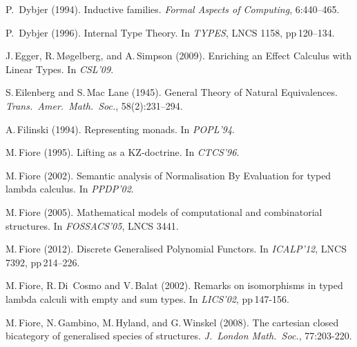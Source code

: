 \documentclass[11pt,twocolumn]{article}
\begin{document}
{\begin{thebibliography}{000}
P.~Dybjer (1994).
\newblock Inductive families.
\newblock \emph{Formal Aspects of Computing}, 6:440--465.

P.~Dybjer (1996).
\newblock Internal Type Theory.
\newblock In \emph{TYPES}, LNCS 1158, pp\,120--134.


J.\,Egger, R.\,M{\o}gelberg, and A.\,Simpson (2009). 
\newblock Enriching an Effect Calculus with Linear Types. 
\newblock In \emph{CSL'09}.

S.\,Eilenberg and S.\,Mac Lane (1945).
\newblock General Theory of Natural Equivalences.
\newblock \emph{Trans.\ Amer.\ Math.\ Soc.},
  58(2):231--294. 

A.\,Filinski (1994).
\newblock Representing monads.
\newblock In \emph{POPL'94}.

M.\,Fiore (1995).  
\newblock Lifting as a KZ-doctrine.  
\newblock In \emph{CTCS'96}.

M.\,Fiore (2002). 
\newblock Semantic analysis of Normalisation By Evaluation for typed
lambda calculus.  
\newblock In \emph{PPDP'02}.

M.\,Fiore (2005).  
\newblock Mathematical models of computational and combinatorial
structures.  
\newblock In \emph{FOSSACS'05}, LNCS 3441. 


M.\,Fiore (2012).   
\newblock Discrete Generalised Polynomial Functors.  
\newblock In \emph{ICALP'12}, LNCS 7392, pp\,214--226.

M.\,Fiore, R.\,Di~Cosmo and V.\,Balat (2002). 
\newblock Remarks on isomorphisms in typed lambda calculi with empty and
sum types.  
\newblock In \emph{LICS'02}, pp\,147-156.  

M.\,Fiore, N.\,Gambino, M.\,Hyland, and G.\,Winskel (2008).   
\newblock The cartesian closed bicategory of generalised species of
structures.
\newblock \emph{J.\ London Math.\ Soc.}, 77:203-220. 


\end{thebibliography}}
\end{document}
